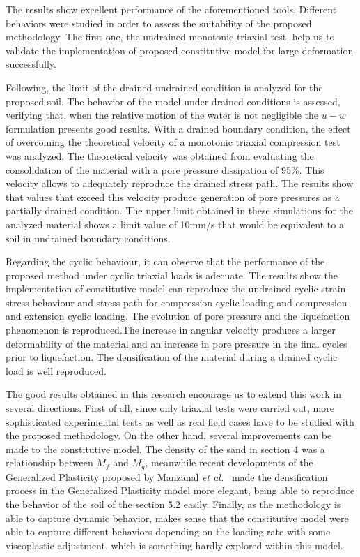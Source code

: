 \documentclass[preprint,12pt,a4paper]{elsarticle}
\begin{document}
The results show excellent performance of the aforementioned tools. Different behaviors were studied in order to assess the suitability of the proposed methodology. The first one, the undrained monotonic triaxial test, help us to validate the implementation of proposed constitutive model for large deformation successfully.

Following, the limit of the drained-undrained condition is analyzed for the proposed soil. The behavior of the model under drained conditions is assessed, verifying that, when the relative motion of the water is not negligible the $u-w$ formulation presents good results. With a drained boundary condition, the effect of overcoming the theoretical velocity of a monotonic triaxial compression test was analyzed. The theoretical velocity was obtained from evaluating the consolidation of the material with a pore pressure dissipation of 95\%. This velocity allows to adequately reproduce the drained stress path. The results show that values that exceed this velocity produce generation of pore pressures as a partially drained condition. The upper limit obtained in these simulations for the analyzed material shows a limit value of 10mm/s that would be equivalent to a soil in undrained boundary conditions.

Regarding the cyclic behaviour, it can observe that the performance of the proposed method under cyclic triaxial loads is adecuate. The results show the implementation of constitutive model can reproduce the undrained cyclic strain-stress behaviour and stress path for compression cyclic loading and compression and extension cyclic loading. The evolution of pore pressure and the liquefaction phenomenon is reproduced.The increase in angular velocity produces a larger deformability of the material and an increase in pore pressure in the final cycles  prior to liquefaction. The densification of the material during a drained cyclic load is well reproduced.

The good results obtained in this research encourage us to extend this work in several directions. First of all, since only triaxial tests were carried out, more sophisticated experimental tests as well as real field cases have to be studied with the proposed methodology. On the other hand, several improvements can be made to the constitutive model. The density of the sand in section 4 was a relationship between $M_f$ and $M_g$, meanwhile recent developments of the Generalized Plasticity proposed by Manzanal \textit{et al.}~\cite{Manzanal2011,Manzanal2011a} made the densification process in the Generalized Plasticity model more elegant, being able to reproduce the behavior of the soil of the section 5.2 easily. Finally, as the methodology is able to capture dynamic behavior, makes sense that the constitutive model were able to capture different behaviors depending on the loading rate with some viscoplastic adjustment, which is something hardly explored within this model. 
\end{document}
